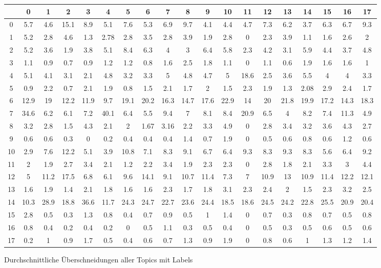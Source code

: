 \documentclass[german,version-2020-11]{uzl-thesis}
\begin{document}
\begin{figure}[H]
\begin{center}
\tiny
\renewcommand{\arraystretch}{2}
\begin{tabular}{ccccccccccccccccccc}
\hline
\hline
&0&1&2&3&4&5&6&7&8&9&10&11&12&13&14&15&16&17\\
\hline
0&5.7&4.6&15.1&8.9&5.1&7.6&5.3&6.9&9.7&4.1&4.4&4.7&7.3&6.2&3.7&6.3&6.7&9.3\\\hline
1&5.2&2.8&4.6&1.3&2.78&2.8&3.5&2.8&3.9&1.9&2.8&0&2.3&3.9&1.1&1.6&2.6&2\\\hline
2&5.2&3.6&1.9&3.8&5.1&8.4&6.3&4&3&6.4&5.8&2.3&4.2&3.1&5.9&4.4&3.7&4.8\\\hline
3&1.1&0.9&0.7&0.9&1.2&1.2&0.8&1.6&2.5&1.8&1.1&0&1.1&0.6&1.9&1.6&1.6&1\\\hline
4&5.1&4.1&3.1&2.1&4.8&3.2&3.3&5&4.8&4.7&5&18.6&2.5&3.6&5.5&4&4&3.3\\\hline
5&0.9&2.2&0.7&2.1&1.9&0.8&1.5&2.1&1.7&2&1.5&2.3&1.9&1.3&2.08&2.9&2.4&1.7\\\hline
6&12.9&19&12.2&11.9&9.7&19.1&20.2&16.3&14.7&17.6&22.9&14&20&21.8&19.9&17.2&14.3&18.3\\\hline
7&34.6&6.2&6.1&7.2&40.1&6.4&5.5&9.4&7&8.1&8.4&20.9&6.5&4&8.2&7.4&11.3&4.9\\\hline
8&3.2&2.8&1.5&4.3&2.1&2&1.67&3.16&2.2&3.3&4.9&0&2.8&3.4&3.2&3.6&4.3&2.7\\\hline
9&0.6&0.6&0.3&0&0.2&0.4&0.4&0.4&1.4&0.7&1.9&0&0.5&0.6&0.8&0.6&1.2&0.6\\\hline
10&2.9&7.6&12.2&5.1&3.9&10.8&7.1&8.3&9.1&6.7&6.4&9.3&8.3&9.3&8.3&5.6&6.4&9.2\\\hline
11&2&1.9&2.7&3.4&2.1&1.2&2.2&3.4&1.9&2.3&2.3&0&2.8&1.8&2.1&3.3&3&4.4\\\hline
12&5&11.2&17.5&6.8&6.1&9.6&14.1&9.1&10.7&11.4&7.3&7&10.9&13&10.9&11.4&12.2&12.1\\\hline
13&1.6&1.9&1.4&2.1&1.8&1.6&1.6&2.3&1.7&1.8&3.1&2.3&2.4&2&1.5&2.3&3.2&2.5\\\hline
14&10.3&28.9&18.8&36.6&11.7&24.3&24.7&22.7&23.6&24.4&18.5&18.6&24.5&24.2&22.8&25.5&20.9&20.4\\\hline
15&2.8&0.5&0.3&1.3&0.8&0.4&0.7&0.9&0.5&1&1.4&0&0.7&0.3&0.8&0.7&0.5&0.8\\\hline
16&0.8&0.4&0.2&0.4&0.2&0&0.5&1.1&0.3&0.5&0.4&0&0.5&0.3&0.5&0.6&0.5&0.6\\\hline
17&0.2&1&0.9&1.7&0.5&0.4&0.6&0.7&1.3&0.9&1.9&0&0.8&0.6&1&1.3&1.2&1.4\\\hline \hline
\end{tabular}
\caption{Durchschnittliche Überschneidungen aller Topics mit Labels}
\end{center}
\end{figure}
\end{document}
